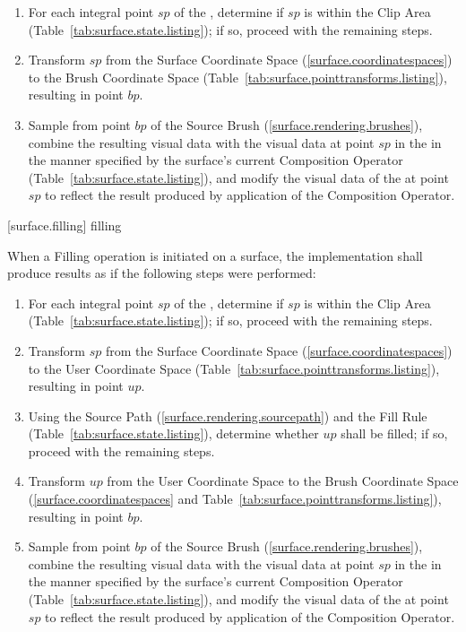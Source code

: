 \begin{enumerate}
\item For each integral point $sp$ of the \underlyingsurface, determine if $sp$ is within the Clip Area (Table~\ref{tab:surface.state.listing}); if so, proceed with the remaining steps.
\item Transform $sp$ from the Surface Coordinate Space (\ref{surface.coordinatespaces}) to the Brush Coordinate Space (Table~\ref{tab:surface.pointtransforms.listing}), resulting in point $bp$.
\item Sample from point $bp$ of the Source Brush (\ref{surface.rendering.brushes}), combine the resulting visual data with the visual data at point $sp$ in the \underlyingsurface in the manner specified by the surface's current Composition Operator (Table~\ref{tab:surface.state.listing}), and modify the visual data of the \underlyingsurface at point $sp$ to reflect the result produced by application of the Composition Operator.
\end{enumerate}

 [surface.filling] { filling}

\pnum
When a Filling operation is initiated on a surface, the implementation shall produce results as if the following steps were performed:

\begin{enumerate}
\item For each integral point $sp$ of the \underlyingsurface, determine if $sp$ is within the Clip Area (Table~\ref{tab:surface.state.listing}); if so, proceed with the remaining steps.
\item Transform $sp$ from the Surface Coordinate Space (\ref{surface.coordinatespaces}) to the User Coordinate Space (Table~\ref{tab:surface.pointtransforms.listing}), resulting in point $up$.
\item Using the Source Path (\ref{surface.rendering.sourcepath}) and the Fill Rule (Table~\ref{tab:surface.state.listing}), determine whether $up$ shall be filled; if so, proceed with the remaining steps.
\item Transform $up$ from the User Coordinate Space to the Brush Coordinate Space (\ref{surface.coordinatespaces} and Table~\ref{tab:surface.pointtransforms.listing}), resulting in point $bp$.
\item Sample from point $bp$ of the Source Brush (\ref{surface.rendering.brushes}), combine the resulting visual data with the visual data at point $sp$ in the \underlyingsurface in the manner specified by the surface's current Composition Operator (Table~\ref{tab:surface.state.listing}), and modify the visual data of the \underlyingsurface at point $sp$ to reflect the result produced by application of the Composition Operator.
\end{enumerate}

